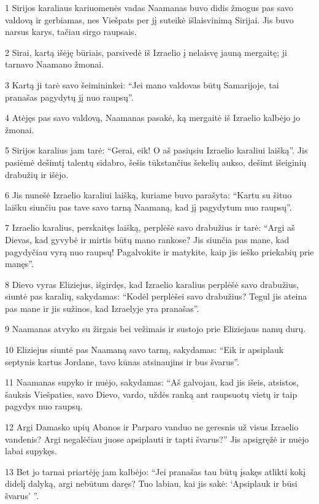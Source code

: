 \par 1 Sirijos karaliaus kariuomenės vadas Naamanas buvo didis žmogus pas savo valdovą ir gerbiamas, nes Viešpats per jį suteikė išlaisvinimą Sirijai. Jis buvo narsus karys, tačiau sirgo raupsais. 
\par 2 Sirai, kartą išėję būriais, parsivedė iš Izraelio į nelaisvę jauną mergaitę; ji tarnavo Naamano žmonai. 
\par 3 Kartą ji tarė savo šeimininkei: “Jei mano valdovas būtų Samarijoje, tai pranašas pagydytų jį nuo raupsų”. 
\par 4 Atėjęs pas savo valdovą, Naamanas pasakė, ką mergaitė iš Izraelio kalbėjo jo žmonai. 
\par 5 Sirijos karalius jam tarė: “Gerai, eik! O aš pasiųsiu Izraelio karaliui laišką”. Jis pasiėmė dešimtį talentų sidabro, šešis tūkstančius šekelių aukso, dešimt išeiginių drabužių ir išėjo. 
\par 6 Jis nunešė Izraelio karaliui laišką, kuriame buvo parašyta: “Kartu su šituo laišku siunčiu pas tave savo tarną Naamaną, kad jį pagydytum nuo raupsų”. 
\par 7 Izraelio karalius, perskaitęs laišką, perplėšė savo drabužius ir tarė: “Argi aš Dievas, kad gyvybė ir mirtis būtų mano rankose? Jis siunčia pas mane, kad pagydyčiau vyrą nuo raupsų! Pagalvokite ir matykite, kaip jis ieško priekabių prie manęs”. 
\par 8 Dievo vyras Eliziejus, išgirdęs, kad Izraelio karalius perplėšė savo drabužius, siuntė pas karalių, sakydamas: “Kodėl perplėšei savo drabužius? Tegul jis ateina pas mane ir jis sužinos, kad Izraelyje yra pranašas”. 
\par 9 Naamanas atvyko su žirgais bei vežimais ir sustojo prie Eliziejaus namų durų. 
\par 10 Eliziejus siuntė pas Naamaną savo tarną, sakydamas: “Eik ir apsiplauk septynis kartus Jordane, tavo kūnas atsinaujins ir bus švarus”. 
\par 11 Naamanas supyko ir nuėjo, sakydamas: “Aš galvojau, kad jis išeis, atsistos, šauksis Viešpaties, savo Dievo, vardo, uždės ranką ant raupsuotų vietų ir taip pagydys nuo raupsų. 
\par 12 Argi Damasko upių Abanos ir Parparo vanduo ne geresnis už visus Izraelio vandenis? Argi negalėčiau juose apsiplauti ir tapti švarus?” Jis apsigręžė ir nuėjo labai supykęs. 
\par 13 Bet jo tarnai priartėję jam kalbėjo: “Jei pranašas tau būtų įsakęs atlikti kokį didelį dalyką, argi nebūtum daręs? Tuo labiau, kai jis sakė: ‘Apsiplauk ir būsi švarus’ ”. 
